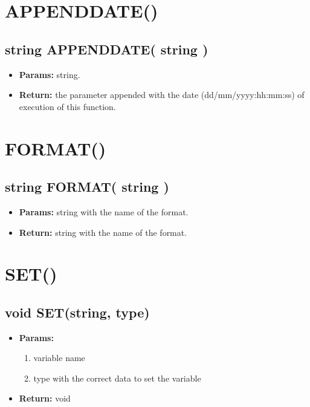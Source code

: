 \documentclass[11pt,a4paper]{article}
\begin{document}
\section*{APPENDDATE()}
\begin{framed}
\subsection*{string APPENDDATE( string )}
\begin{itemize}
\item \textbf{Params:} string.
\item \textbf{Return:} the parameter appended with the date (dd/mm/yyyy:hh:mm:ss) of execution of this function.
\end{itemize}
\end{framed}

\section*{FORMAT()}
\begin{framed}
\subsection*{string FORMAT( string )}
\begin{itemize}
\item \textbf{Params:} string with the name of the format.
\item \textbf{Return:} string with the name of the format.
\end{itemize}
\end{framed}

\section*{SET()}
\begin{framed}
\subsection*{void SET(string, type)}
\begin{itemize}
\item \textbf{Params:}
\begin{enumerate}
\item variable name
\item type with the correct data to set the variable
\end{enumerate}
\item \textbf{Return:} void
\end{itemize}
\end{framed}
\end{document}
